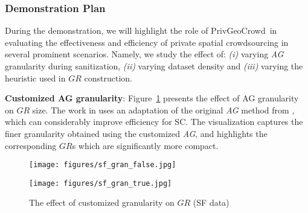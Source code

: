 \documentclass{USC-Thesis}
\newcommand{\PGC}{{PrivGeoCrowd}}
\numberwithin{equation}{chapter}
\begin{document}
\subsubsection{Demonstration Plan}
\label{sec:scenario}

During the demonstration, we will highlight the role of \PGC\ in evaluating the effectiveness and efficiency of private spatial crowdsourcing in several prominent scenarios. Namely, we study the effect of: {\em (i)} varying {\em AG} granularity during sanitization, {\em (ii)} varying dataset density and {\em (iii)} varying the heuristic used in $GR$ construction.


\textbf{Customized AG granularity}: Figure~\ref{fig:customized_gran} presents the effect of AG granularity on $\mathit{GR}$ size. The work in \cite{to2014framework} uses an adaptation of the original {\em AG} method from \cite{qardaji2012differentially}, which can considerably improve efficiency for SC. The visualization captures the finer granularity obtained using the customized {\em AG}, and highlights the corresponding $\mathit{GR}$s which are significantly more compact.

\begin{figure}[!ht]
	\centering
	\begin{minipage}[b]{0.35\linewidth}
		\texttt{[image: figures/sf\_gran\_false.jpg]}
		\label{fig:original_AG}
	\end{minipage}
	\hspace{1cm}
	\centering
	\begin{minipage}[b]{0.35\linewidth}
		\texttt{[image: figures/sf\_gran\_true.jpg]}
		\label{fig:modified_AG}
	\end{minipage}
	\caption{The effect of customized granularity on $\mathit{GR}$ (SF data)}
\label{fig:customized_gran}
\end{figure}
\end{document}
